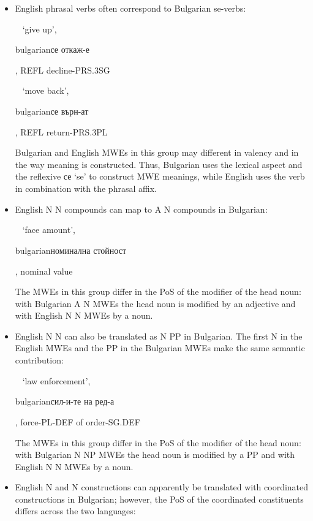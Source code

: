 \documentclass[output=paper]{langsci/langscibook}
\begin{document}
\begin{itemize}

\item English phrasal verbs often correspond to Bulgarian se-verbs:

\verb+ + `give up', \begin{otherlanguage*}{bulgarian}се
откаж-е\end{otherlanguage*}, \textsc{REFL} decline-\textsc{PRS.3SG}

\verb+ + `move back', \begin{otherlanguage*}{bulgarian}се
върн-ат\end{otherlanguage*}, \textsc{REFL} return-\textsc{PRS.3PL}

Bulgarian and English MWEs in this group may different in valency and in the
way meaning is constructed. Thus, Bulgarian uses the lexical aspect and the
reflexive се `se' to construct MWE meanings, while English uses the verb in
combination with the phrasal affix.

\item English N N compounds  can map to A N compounds in Bulgarian:

\verb+ + `face amount', \begin{otherlanguage*}{bulgarian}номинална
стойност\end{otherlanguage*}, nominal value

The MWEs in this group differ in the PoS of the modifier of the head noun:
with Bulgarian A N MWEs the head noun is modified by an adjective and with
English N N MWEs  by a noun.

\item English N N can also be translated as N PP in Bulgarian. The first
N in the English MWEs and the PP in the Bulgarian MWEs make the same
semantic contribution:

\verb+ + `law enforcement', \begin{otherlanguage*}{bulgarian}сил-и-те
на ред-а\end{otherlanguage*}, force-\textsc{PL-DEF} of order-\textsc{SG.DEF}

The MWEs in this group differ in the PoS of the modifier of the head noun:
with Bulgarian N NP MWEs the head noun is modified by a PP and with English
N N MWEs by a noun.

\item English N and N constructions  can apparently be translated with
coordinated constructions in Bulgarian; however, the PoS of the coordinated
constituents differs across the two languages:


\end{itemize}
\end{document}
